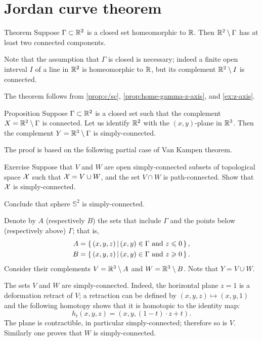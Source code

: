 \chapter{Jordan curve theorem}

\begin{thm}{Theorem}\label{thm:proper-jordan}
Suppose $\Gamma\subset\mathbb{R}^2$ is a closed set homeomorphic to $\mathbb{R}$.
Then $\mathbb{R}^2\setminus \Gamma$ has at least two connected components.
\end{thm}

Note that the assumption that $\Gamma$ is closed is necessary;
indeed a finite open interval $I$ of a line in $\mathbb{R}^2$ is homeomorphic to $\mathbb{R}$, but its complement $\mathbb{R}^2\setminus I$ is connected.

The theorem follows from \ref{prop:c/sc}, \ref{prop:home-gamma-z-axis}, and \ref{ex:z-axis}.


\begin{thm}{Proposition}\label{prop:c/sc}
Suppose $\Gamma\subset\mathbb{R}^2$ is a closed set such that the complement $X=\mathbb{R}^2\setminus \Gamma$ is connected.
Let us identify $\mathbb{R}^2$ with the $(x,y)$-plane in $\mathbb{R}^3$.
Then the complement $Y=\mathbb{R}^3\setminus \Gamma$ is simply-connected.
\end{thm}

The proof is based on the following partial case of Van Kampen theorem.

\begin{thm}{Exercise}\label{ex:sc-VuW}
Suppose that $V$ and $W$ are open simply-connected subsets of topological space $\mathcal{X}$ such that 
$\mathcal{X}=V\cup W$, and the set $V\cap W$ is path-connected.
Show that $\mathcal{X}$ is simply-connected.

Conclude that sphere $\mathbb{S}^2$ is simply-connected.
\end{thm}


Denote by $A$ (respectively $B$) the sets that include $\Gamma$ and the points below (respectively above) $\Gamma$;
that is,
\begin{align*}
A&=\left\{\,{(x,y,z)}\,\middle|\,{(x,y)\in\Gamma\ \text{and}\ z\leqslant 0}\,\right\},
\\
B&=\left\{\,{(x,y,z)}\,\middle|\,{(x,y)\in\Gamma\ \text{and}\ z\geqslant 0}\,\right\}.
\end{align*}
Consider their complements $V=\mathbb{R}^3\setminus A$ and $W=\mathbb{R}^3\setminus B$.
Note that $Y=V\cup W$.

The sets $V$ and $W$ are simply-connected.
Indeed, the horizontal plane $z= 1$ is a deformation retract of $V$;
a retraction can be defined by $(x,y,z)\mapsto (x,y,1)$ and the following homotopy shows that it is homotopic to the identity map: 
\[h_t(x,y,z)=(x,y,(1-t)\cdot z+t).\]
The plane is contractible, in particular simply-connected; therefore so is $V$.
Similarly one proves that $W$ is simply-connected.


